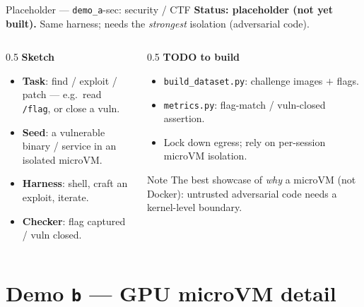 \documentclass[aspectratio=169]{beamer}
\begin{document}
\begin{frame}{Placeholder --- \texttt{demo\_a}-sec: security / CTF}
  \footnotesize\textbf{Status: placeholder (not yet built).} Same harness; needs the \emph{strongest}
  isolation (adversarial code).
  \begin{columns}[T]
    \begin{column}{0.5\textwidth}
      \textbf{Sketch}
      \begin{itemize}\scriptsize\setlength\itemsep{0.1em}
        \item \textbf{Task}: find / exploit / patch --- e.g.\ read \texttt{/flag}, or close a vuln.
        \item \textbf{Seed}: a vulnerable binary / service in an isolated microVM.
        \item \textbf{Harness}: shell, craft an exploit, iterate.
        \item \textbf{Checker}: flag captured / vuln closed.
      \end{itemize}
    \end{column}
    \begin{column}{0.5\textwidth}
      \textbf{TODO to build}
      \begin{itemize}\scriptsize\setlength\itemsep{0.1em}
        \item \texttt{build\_dataset.py}: challenge images $+$ flags.
        \item \texttt{metrics.py}: flag-match / vuln-closed assertion.
        \item Lock down egress; rely on per-session microVM isolation.
      \end{itemize}
      \begin{block}{Note}
        \scriptsize The best showcase of \emph{why} a microVM (not Docker): untrusted adversarial code
        needs a kernel-level boundary.
      \end{block}
    \end{column}
  \end{columns}
\end{frame}

\section{Demo \texttt{b} --- GPU microVM detail}
\end{document}

